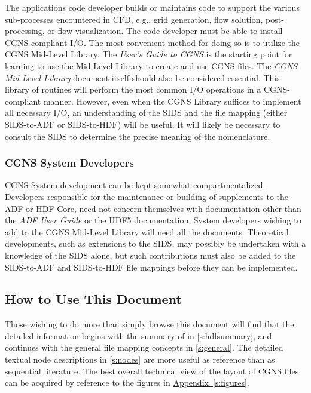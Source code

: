 The applications code developer builds or maintains code to support the
various sub-processes encountered in CFD, e.g., grid generation, flow
solution, post-processing, or flow visualization. The code developer
must be able to install CGNS compliant I/O. The most convenient method
for doing so is to utilize the CGNS Mid-Level Library.
The \textit{User's Guide to CGNS} is the starting point for learning to
use the Mid-Level Library to create and use CGNS files.
The \textit{CGNS Mid-Level
Library} document itself should also be considered essential.
This library of routines will perform the most common I/O operations in
a CGNS-compliant manner.
However, even when the CGNS Library suffices to implement all necessary
I/O, an understanding of the SIDS and the file mapping (either
SIDS-to-ADF or SIDS-to-HDF) will be useful.
It will likely be necessary to consult the SIDS to determine the
precise meaning of the nomenclature.

%

\subsubsection{CGNS System Developers}

CGNS System development can be kept somewhat compartmentalized.
Developers responsible for the maintenance or building of supplements
to the ADF or HDF Core, need not concern themselves with documentation
other than the \textit{ADF User Guide} or the HDF5 documentation.
System developers wishing to add to the CGNS Mid-Level Library will need
all the documents.
Theoretical developments, such as extensions to the SIDS, may possibly
be undertaken with a knowledge of the SIDS alone, but such contributions
must also be added to the SIDS-to-ADF and SIDS-to-HDF file mappings
before they can be implemented.

\subsection{How to Use This Document}

Those wishing to do more than simply browse this document will
find that the detailed information begins with the summary of \HDF
in \autoref{s:hdfsummary}, and continues with the general file
mapping concepts in \autoref{s:general}. The detailed textual node
descriptions in \autoref{s:nodes} are more useful as reference than
as sequential literature. The best overall technical view of the
layout of CGNS files can be acquired by reference to the figures in
\hyperref[s:figures]{Appendix~\ref*{s:figures}}.
